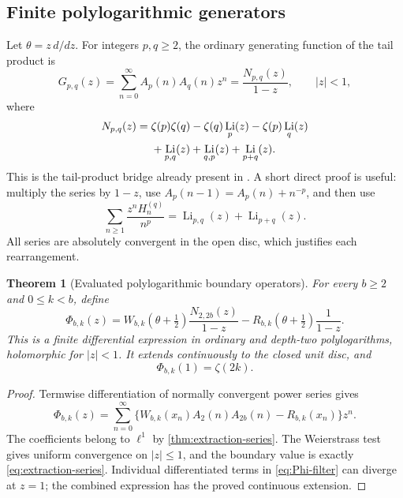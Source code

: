\documentclass[11pt,letterpaper]{article}
\newtheorem{theorem}{Theorem}[section]
\theoremstyle{definition}
\theoremstyle{remark}
\DeclareMathOperator{\Li}{Li}
\numberwithin{equation}{section}
\begin{document}
\subsection{Finite polylogarithmic generators}

Let $\theta=z\,d/dz$. For integers $p,q\geq2$, the ordinary
generating function of the tail product is
\begin{equation}\label{eq:Gpq}
 G_{p,q}(z)=\sum_{n=0}^{\infty}A_p(n)A_q(n)z^n
 =\frac{N_{p,q}(z)}{1-z},\qquad |z|<1,
\end{equation}
where
\begin{align}\label{eq:Npq}
 N_{p,q}(z)={}&\zeta(p)\zeta(q)-\zeta(q)\Li_p(z)
             -\zeta(p)\Li_q(z)\notag\\
 &+\Li_{p,q}(z)+\Li_{q,p}(z)+\Li_{p+q}(z).
\end{align}
This is the tail-product bridge already present in
\cite{incoming-tail}. A short direct proof is useful: multiply the
series by $1-z$, use
$A_p(n-1)=A_p(n)+n^{-p}$, and then use
\[
 \sum_{n\geq1}\frac{z^nH_n^{(q)}}{n^p}
   =\Li_{p,q}(z)+\Li_{p+q}(z).
\]
All series are absolutely convergent in the open disc, which justifies
each rearrangement.

\begin{theorem}[Evaluated polylogarithmic boundary operators]
\label{thm:polylog-filter}
For every $b\geq2$ and $0\leq k<b$, define
\begin{equation}\label{eq:Phi-filter}
 \Phi_{b,k}(z)=
 W_{b,k}(\theta+\tfrac12)\frac{N_{2,2b}(z)}{1-z}
 -R_{b,k}(\theta+\tfrac12)\frac1{1-z}.
\end{equation}
This is a finite differential expression in ordinary and depth-two
polylogarithms, holomorphic for $|z|<1$. It extends continuously to
the closed unit disc, and
\begin{equation}\label{eq:Phi-boundary}
 \boxed{\Phi_{b,k}(1)=\zeta(2k).}
\end{equation}
\end{theorem}
\begin{proof}
Termwise differentiation of normally convergent power series gives
\[
 \Phi_{b,k}(z)=\sum_{n=0}^{\infty}
 \{W_{b,k}(x_n)A_2(n)A_{2b}(n)-R_{b,k}(x_n)\}z^n.
\]
The coefficients belong to $\ell^1$ by
\cref{thm:extraction-series}. The Weierstrass test gives uniform
convergence on $|z|\leq1$, and the boundary value is exactly
\eqref{eq:extraction-series}. Individual differentiated terms in
\eqref{eq:Phi-filter} can diverge at $z=1$; the combined expression
has the proved continuous extension.
\end{proof}
\end{document}
